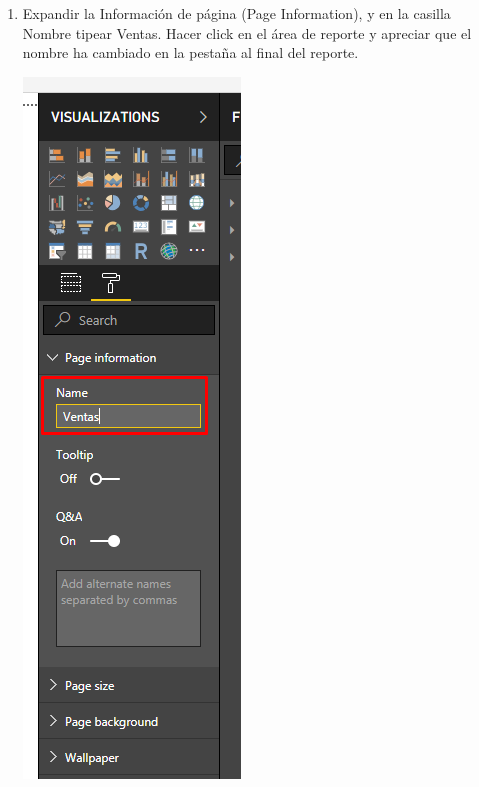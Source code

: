 \begin{itemize}
\begin{enumerate}
\item Expandir la Información de página (Page Information), y en la casilla Nombre tipear Ventas. Hacer click en el área de reporte y apreciar que el nombre ha cambiado en la pestaña al final del reporte.
\begin{center}
\includegraphics[scale=0.55]{./Imagenes/21.png}
\end{center}


\end{enumerate}
\end{itemize}
